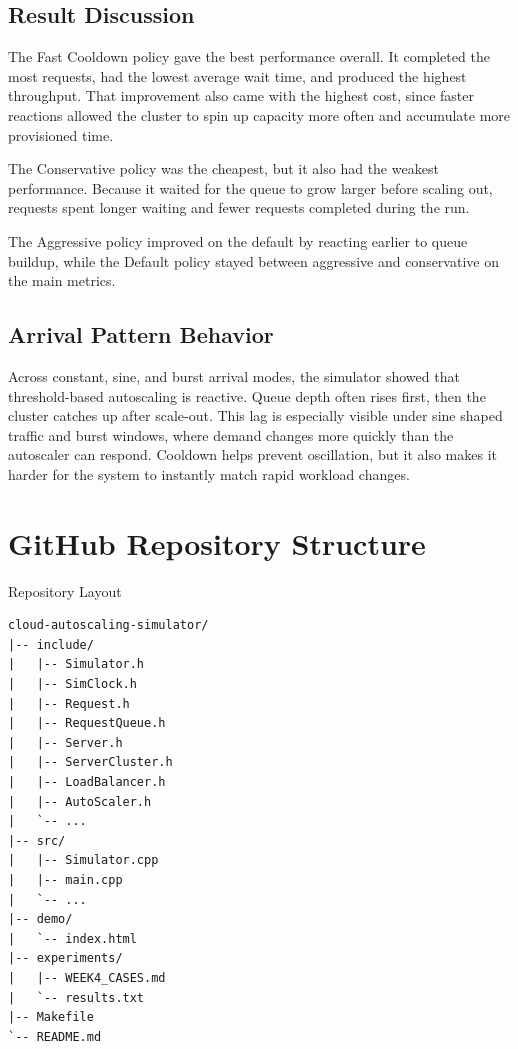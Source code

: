 \documentclass[12pt, a4paper]{article}
\begin{document}
\subsection{Result Discussion}

The Fast Cooldown policy gave the best performance overall.
It completed the most requests, had the lowest average wait time, and produced
the highest throughput.
That improvement also came with the highest cost, since faster reactions allowed
the cluster to spin up capacity more often and accumulate more provisioned time.

The Conservative policy was the cheapest, but it also had the weakest
performance.
Because it waited for the queue to grow larger before scaling out, requests
spent longer waiting and fewer requests completed during the run.

The Aggressive policy improved on the default by reacting earlier to
queue buildup, while the Default policy stayed between
aggressive and conservative on the main metrics.

\subsection{Arrival Pattern Behavior}

Across constant, sine, and burst arrival modes, the simulator showed that
threshold-based autoscaling is reactive.
Queue depth often rises first, then the cluster catches up after scale-out.
This lag is especially visible under sine shaped traffic and burst windows,
where demand changes more quickly than the autoscaler can respond.
Cooldown helps prevent oscillation, but it also makes it harder for the system
to instantly match rapid workload changes.

\section{GitHub Repository Structure}

\begin{codebox}[]{Repository Layout}
\begin{lstlisting}[style=pseudo, numbers=none]
cloud-autoscaling-simulator/
|-- include/
|   |-- Simulator.h
|   |-- SimClock.h
|   |-- Request.h
|   |-- RequestQueue.h
|   |-- Server.h
|   |-- ServerCluster.h
|   |-- LoadBalancer.h
|   |-- AutoScaler.h
|   `-- ...
|-- src/
|   |-- Simulator.cpp
|   |-- main.cpp
|   `-- ...
|-- demo/
|   `-- index.html
|-- experiments/
|   |-- WEEK4_CASES.md
|   `-- results.txt
|-- Makefile
`-- README.md
\end{lstlisting}
\end{codebox}
\end{document}
